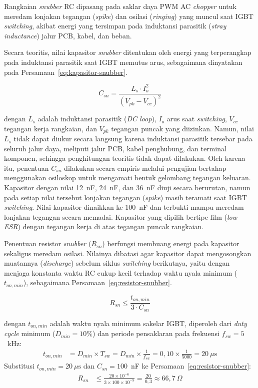 Rangkaian \emph{snubber} RC dipasang pada saklar daya PWM AC \emph{chopper}
untuk meredam lonjakan tegangan (\emph{spike}) dan osilasi (\emph{ringing})
yang muncul saat IGBT \emph{switching}, akibat energi yang tersimpan pada
induktansi parasitik (\emph{stray inductance}) jalur PCB, kabel, dan beban.

Secara teoritis, nilai kapasitor \emph{snubber} ditentukan oleh energi yang
terperangkap pada induktansi parasitik saat IGBT memutus arus, sebagaimana
dinyatakan pada Persamaan~\ref{eq:kapasitor-snubber}.

\begin{equation}
  C_{sn} = \frac{L_s \cdot I_o^{2}}{(V_{pk} - V_{cc})^{2}}
  \label{eq:kapasitor-snubber}
\end{equation}

dengan $L_s$ adalah induktansi parasitik (\emph{DC loop}), $I_o$ arus saat
\emph{switching}, $V_{cc}$ tegangan kerja rangkaian, dan $V_{pk}$ tegangan
puncak yang diizinkan. Namun, nilai $L_s$ tidak dapat diukur secara langsung
karena induktansi parasitik tersebar pada seluruh jalur daya, meliputi jalur
PCB, kabel penghubung, dan terminal komponen, sehingga penghitungan teoritis
tidak dapat dilakukan. Oleh karena itu, penentuan $C_{sn}$ dilakukan secara
empiris melalui pengujian bertahap menggunakan osiloskop untuk mengamati
bentuk gelombang tegangan keluaran. Kapasitor dengan nilai 12~nF, 24~nF, dan
36~nF diuji secara berurutan, namun pada setiap nilai tersebut lonjakan
tegangan (\emph{spike}) masih teramati saat IGBT \emph{switching}. Nilai
kapasitor dinaikkan ke 100~nF dan terbukti mampu meredam lonjakan
tegangan secara memadai. Kapasitor yang dipilih bertipe film (\emph{low ESR})
dengan tegangan kerja di atas tegangan puncak rangkaian.

Penentuan resistor \emph{snubber} ($R_{sn}$) berfungsi membuang energi pada kapasitor
sekaligus meredam osilasi. Nilainya dibatasi agar kapasitor dapat
mengosongkan muatannya (\emph{discharge}) sebelum siklus \emph{switching}
berikutnya, yaitu dengan menjaga konstanta waktu RC cukup kecil terhadap
waktu nyala minimum ($t_{on,min}$), sebagaimana
Persamaan~\ref{eq:resistor-snubber}.

\begin{equation}
  R_{sn} \leq \frac{t_{on,min}}{3 \cdot C_{sn}}
  \label{eq:resistor-snubber}
\end{equation}

dengan $t_{on,min}$ adalah waktu nyala minimum sakelar IGBT, diperoleh dari
\emph{duty cycle} minimum ($D_{min} = 10\%$) dan periode pensaklaran pada
frekuensi $f_{sw} = 5$~kHz:
%
\begin{align*}
  t_{on,min} &= D_{min} \times T_{sw}
              = D_{min} \times \frac{1}{f_{sw}}
              = 0{,}10 \times \frac{1}{5000}
              = 20~\mu\text{s}
\end{align*}
%
Substitusi $t_{on,min} = 20~\mu\text{s}$ dan $C_{sn} = 100$~nF ke
Persamaan~\ref{eq:resistor-snubber}:
%
\begin{align*}
  R_{sn} &\leq \frac{20 \times 10^{-6}}{3 \times 100 \times 10^{-9}}
           = \frac{20}{0{,}3}
           \approx 66{,}7~\Omega
\end{align*}

